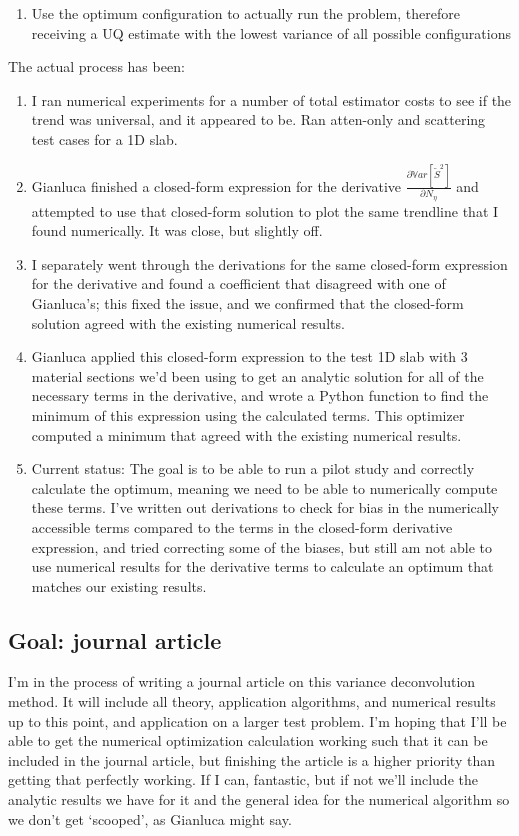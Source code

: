 \begin{itemize}
\begin{enumerate}
        \item Use the optimum configuration to actually run the problem, therefore receiving a UQ estimate with the lowest variance of all possible configurations
    \end{enumerate}
    The actual process has been:
    \begin{enumerate}
        \item I ran numerical experiments for a number of total estimator costs to see if the trend was universal, and it appeared to be. Ran atten-only and scattering test cases for a 1D slab. 
        \item Gianluca finished a closed-form expression for the derivative $\frac{\partial \mathbb{V}ar[\tilde{S}^2]}{\partial N_\eta}$ and attempted to use that closed-form solution to plot the same trendline that I found numerically. It was close, but slightly off. 
        \item I separately went through the derivations for the same closed-form expression for the derivative and found a coefficient that disagreed with one of Gianluca's; this fixed the issue, and we confirmed that the closed-form solution agreed with the existing numerical results. 
        \item Gianluca applied this closed-form expression to the test 1D slab with 3 material sections we'd been using to get an analytic solution for all of the necessary terms in the derivative, and wrote a Python function to find the minimum of this expression using the calculated terms. This optimizer computed a minimum that agreed with the existing numerical results. 
        \item Current status: The goal is to be able to run a pilot study and correctly calculate the optimum, meaning we need to be able to numerically compute these terms. I've written out derivations to check for bias in the numerically accessible terms compared to the terms in the closed-form derivative expression, and tried correcting some of the biases, but still am not able to use numerical results for the derivative terms to calculate an optimum that matches our existing results. 
    \end{enumerate}
\end{itemize}
\subsection{Goal: journal article}
I'm in the process of writing a journal article on this variance deconvolution method. It will include all theory, application algorithms, and numerical results up to this point, and application on a larger test problem. I'm hoping that I'll be able to get the numerical optimization calculation working such that it can be included in the journal article, but finishing the article is a higher priority than getting that perfectly working. If I can, fantastic, but if not we'll include the analytic results we have for it and the general idea for the numerical algorithm so we don't get `scooped', as Gianluca might say. 




